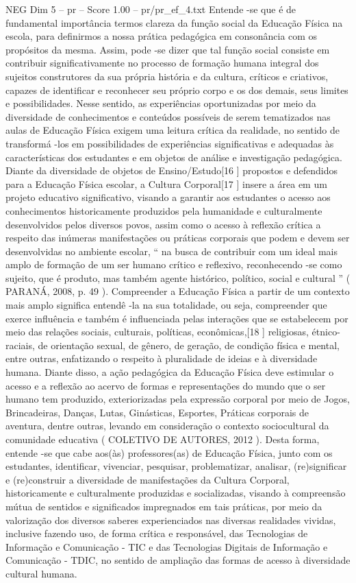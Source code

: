 \begin{textsample}{NEG Dim 5 – pr – Score 1.00 – pr/pr\_ef\_4.txt}
Entende -se que é de fundamental importância termos clareza da função social da Educação Física na escola, para definirmos a nossa prática pedagógica em consonância com os propósitos da mesma.
Assim, pode -se dizer que tal função social consiste em contribuir significativamente no processo de formação humana integral dos sujeitos construtores da sua própria história e da cultura, críticos e criativos, capazes de identificar e reconhecer seu próprio corpo e os dos demais, seus limites e possibilidades.
Nesse sentido, as experiências oportunizadas por meio da diversidade de conhecimentos e conteúdos possíveis de serem tematizados nas aulas de Educação Física exigem uma leitura crítica da realidade, no sentido de transformá -los em possibilidades de experiências significativas e adequadas às características dos estudantes e em objetos de análise e investigação pedagógica.
Diante da diversidade de objetos de Ensino/Estudo[16 ] propostos e defendidos para a Educação Física escolar, a Cultura Corporal[17 ] insere a área em um projeto educativo significativo, visando a garantir aos estudantes o acesso aos conhecimentos historicamente produzidos pela humanidade e culturalmente desenvolvidos pelos diversos povos, assim como o acesso à reflexão crítica a respeito das inúmeras manifestações ou práticas corporais que podem e devem ser desenvolvidas no ambiente escolar, “ na busca de contribuir com um ideal mais amplo de formação de um ser humano crítico e reflexivo, reconhecendo -se como sujeito, que é produto, mas também agente histórico, político, social e cultural ” ( PARANÁ, 2008, p. 49 ).
Compreender a Educação Física a partir de um contexto mais amplo significa entendê -la na sua totalidade, ou seja, compreender que exerce influência e também é influenciada pelas interações que se estabelecem por meio das relações sociais, culturais, políticas, econômicas,[18 ] religiosas, étnico-raciais, de orientação sexual, de gênero, de geração, de condição física e mental, entre outras, enfatizando o respeito à pluralidade de ideias e à diversidade humana.
Diante disso, a ação pedagógica da Educação Física deve estimular o acesso e a reflexão ao acervo de formas e representações do mundo que o ser humano tem produzido, exteriorizadas pela expressão corporal por meio de Jogos, Brincadeiras, Danças, Lutas, Ginásticas, Esportes, Práticas corporais de aventura, dentre outras, levando em consideração o contexto sociocultural da comunidade educativa ( COLETIVO DE AUTORES, 2012 ).
Desta forma, entende -se que cabe aos(às) professores(as) de Educação Física, junto com os estudantes, identificar, vivenciar, pesquisar, problematizar, analisar, (re)significar e (re)construir a diversidade de manifestações da Cultura Corporal, historicamente e culturalmente produzidas e socializadas, visando à compreensão mútua de sentidos e significados impregnados em tais práticas, por meio da valorização dos diversos saberes experienciados nas diversas realidades vividas, inclusive fazendo uso, de forma crítica e responsável, das Tecnologias de Informação e Comunicação - TIC e das Tecnologias Digitais de Informação e Comunicação - TDIC, no sentido de ampliação das formas de acesso à diversidade cultural humana.

\end{textsample}
